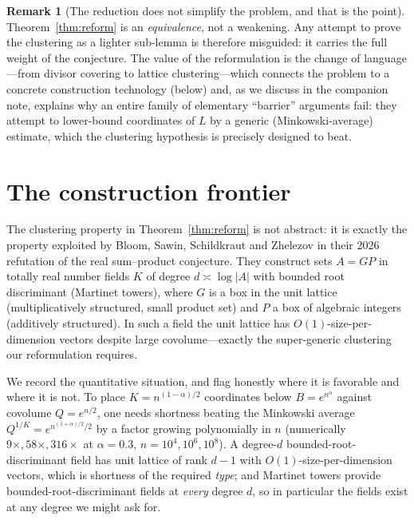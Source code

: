 \documentclass[11pt]{article}
\theoremstyle{definition}
\newtheorem{remark}[theorem]{Remark}
\begin{document}
\begin{remark}[The reduction does not simplify the problem, and that is the point]
Theorem~\ref{thm:reform} is an \emph{equivalence}, not a weakening. Any attempt to
prove the clustering as a lighter sub-lemma is therefore misguided: it carries the
full weight of the conjecture. The value of the reformulation is the change of
language---from divisor covering to lattice clustering---which connects the problem
to a concrete construction technology (below) and, as we discuss in the companion
note, explains why an entire family of elementary ``barrier'' arguments fail: they
attempt to lower-bound coordinates of $L$ by a generic (Minkowski-average) estimate,
which the clustering hypothesis is precisely designed to beat.
\end{remark}

\section{The construction frontier}

The clustering property in Theorem~\ref{thm:reform} is not abstract: it is exactly
the property exploited by Bloom, Sawin, Schildkraut and Zhelezov \cite{BSSZ} in
their 2026 refutation of the real sum--product conjecture. They construct sets
$A=GP$ in totally real number fields $K$ of degree $d\asymp\log|A|$ with
bounded root discriminant (Martinet towers), where $G$ is a box in the unit lattice
(multiplicatively structured, small product set) and $P$ a box of algebraic
integers (additively structured). In such a field the unit lattice has
$O(1)$-size-per-dimension vectors despite large covolume---exactly the
super-generic clustering our reformulation requires.

We record the quantitative situation, and flag honestly where it is favorable and
where it is not. To place $K=n^{(1-\alpha)/2}$ coordinates below $B=e^{n^{\alpha}}$
against covolume $Q=e^{n/2}$, one needs shortness beating the Minkowski average
$Q^{1/K}=e^{n^{(1+\alpha)/2}/2}$ by a factor growing polynomially in $n$
(numerically $9\times,58\times,316\times$ at $\alpha=0.3$, $n=10^4,10^6,10^8$).
A degree-$d$ bounded-root-discriminant field has unit lattice of rank $d-1$ with
$O(1)$-size-per-dimension vectors, which is shortness of the required \emph{type};
and Martinet towers provide bounded-root-discriminant fields at \emph{every} degree
$d$, so in particular the fields exist at any degree we might ask for.
\end{document}
